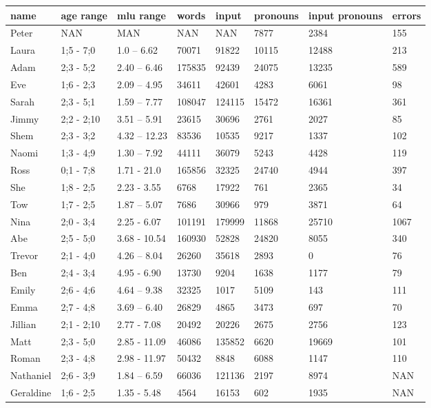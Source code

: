 \begin{table}[]
\small
\begin{tabular}{llllllll}
name & age range & mlu range &  words & input  & pronouns & input pronouns & errors \\
\toprule
Peter & NAN & MAN & NAN & NAN & 7877 & 2384 & 155 \\
Laura & 1;5 - 7;0 & 1.0 – 6.62 & 70071 & 91822 & 10115 & 12488 & 213 \\
Adam & 2;3 - 5;2 & 2.40 – 6.46 & 175835 & 92439 & 24075 & 13235 & 589 \\
Eve & 1;6 - 2;3 & 2.09 – 4.95 & 34611 & 42601 & 4283 & 6061 & 98 \\
Sarah & 2;3 - 5;1 & 1.59 – 7.77 & 108047 & 124115 & 15472 & 16361 & 361 \\
Jimmy & 2;2 - 2;10 & 3.51 – 5.91 & 23615 & 30696 & 2761 & 2027 & 85 \\
Shem & 2;3 - 3;2 & 4.32 – 12.23 & 83536 & 10535 & 9217 & 1337 & 102 \\
Naomi & 1;3 - 4;9 & 1.30 – 7.92 & 44111 & 36079 & 5243 & 4428 & 119 \\
Ross & 0;1 - 7;8 & 1.71 - 21.0 & 165856 & 32325 & 24740 & 4944 & 397 \\
She & 1;8 - 2;5 & 2.23 - 3.55 & 6768 & 17922 & 761 & 2365 & 34 \\
Tow & 1;7 - 2;5 & 1.87 – 5.07 & 7686 & 30966 & 979 & 3871 & 64 \\
Nina & 2;0 - 3;4 & 2.25 - 6.07 & 101191 & 179999 & 11868 & 25710 & 1067 \\
Abe & 2;5 - 5;0 & 3.68 - 10.54 & 160930 & 52828 & 24820 & 8055 & 340 \\
Trevor & 2;1 - 4;0 & 4.26 – 8.04 & 26260 & 35618 & 2893 & 0 & 76 \\
Ben & 2;4 - 3;4 & 4.95 - 6.90 & 13730 & 9204 & 1638 & 1177 & 79 \\
Emily & 2;6 - 4;6 & 4.64 – 9.38 & 32325 & 1017 & 5109 & 143 & 111 \\
Emma & 2;7 - 4;8 & 3.69 – 6.40 & 26829 & 4865 & 3473 & 697 & 70 \\
Jillian & 2;1 - 2;10 & 2.77 - 7.08 & 20492 & 20226 & 2675 & 2756 & 123 \\
Matt & 2;3 - 5;0 & 2.85 - 11.09 & 46086 & 135852 & 6620 & 19669 & 101 \\
Roman & 2;3 - 4;8 & 2.98 - 11.97 & 50432 & 8848 & 6088 & 1147 & 110 \\
Nathaniel & 2;6 - 3;9 & 1.84 – 6.59 & 66036 & 121136 & 2197 & 8974 & NAN \\
Geraldine & 1;6 - 2;5 & 1.35 - 5.48 & 4564 & 16153 & 602 & 1935 & NAN \\

\end{tabular}
\end{table}
